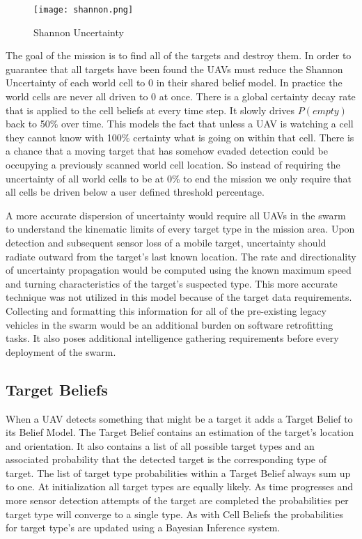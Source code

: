 \begin{multicols*}{2}
	
	\begin{figure}[H]
		\centering
		\texttt{[image: shannon.png]}
		\caption{Shannon Uncertainty}
		\label{fig:shannon}
	\end{figure}
	
The goal of the mission is to find all of the targets and destroy them.  In order to guarantee that all targets have been found the UAVs must reduce the Shannon Uncertainty of each world cell to 0 in their shared belief model.  In practice the world cells are never all driven to 0 at once.  There is a global certainty decay rate that is applied to the cell beliefs at every time step.  It slowly drives $P(empty)$ back to 50\% over time.  This models the fact that unless a UAV is watching a cell they cannot know with 100\% certainty what is going on within that cell.  There is a chance that a moving target that has somehow evaded detection could be occupying a previously scanned world cell location.  So instead of requiring the uncertainty of all world cells to be at 0\% to end the mission we only require that all cells be driven below a user defined threshold percentage.

A more accurate dispersion of uncertainty would require all UAVs in the swarm to understand the kinematic limits of every target type in the mission area.  Upon detection and subsequent sensor loss of a mobile target, uncertainty should radiate outward from the target's last known location.  The rate and directionality of uncertainty propagation would be computed using the known maximum speed and turning characteristics of the target's suspected type. This more accurate technique was not utilized in this model because of the target data requirements.  Collecting and formatting this information for all of the pre-existing legacy vehicles in the swarm would be an additional burden on software retrofitting tasks.  It also poses additional intelligence gathering requirements before every deployment of the swarm.


\subsection{Target Beliefs}
When a UAV detects something that might be a target it adds a Target Belief to its Belief Model.  The Target Belief contains an estimation of the target's location and orientation.  It also contains a list of all possible target types and an associated probability that the detected target is the corresponding type of target. The list of target type probabilities within a Target Belief always sum up to one.  At initialization all target types are equally likely.  As time progresses and more sensor detection attempts of the target are completed the probabilities per target type will converge to a single type.  As with Cell Beliefs the probabilities for target type's are updated using a Bayesian Inference system.  


\end{multicols*}
